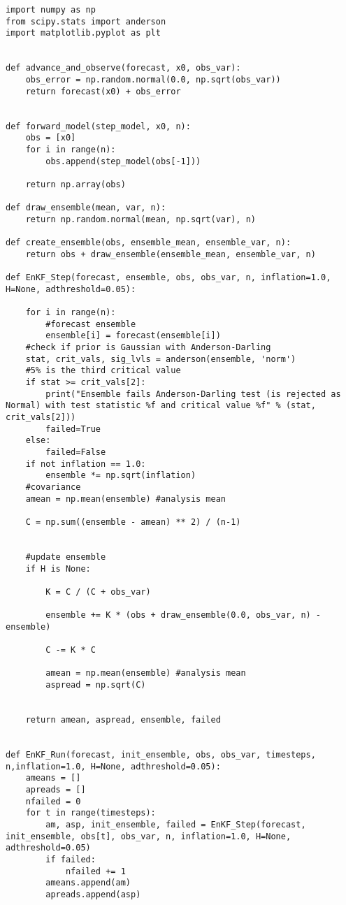 \documentclass[11pt]{article}
\begin{document}
\begin{Verbatim}[xleftmargin=-2cm]
import numpy as np
from scipy.stats import anderson
import matplotlib.pyplot as plt


def advance_and_observe(forecast, x0, obs_var):
    obs_error = np.random.normal(0.0, np.sqrt(obs_var))
    return forecast(x0) + obs_error


def forward_model(step_model, x0, n):
    obs = [x0]
    for i in range(n):
        obs.append(step_model(obs[-1]))

    return np.array(obs)

def draw_ensemble(mean, var, n):
    return np.random.normal(mean, np.sqrt(var), n)

def create_ensemble(obs, ensemble_mean, ensemble_var, n):
    return obs + draw_ensemble(ensemble_mean, ensemble_var, n)

def EnKF_Step(forecast, ensemble, obs, obs_var, n, inflation=1.0, H=None, adthreshold=0.05):
    
    for i in range(n):
        #forecast ensemble
        ensemble[i] = forecast(ensemble[i])
    #check if prior is Gaussian with Anderson-Darling
    stat, crit_vals, sig_lvls = anderson(ensemble, 'norm')
    #5% is the third critical value
    if stat >= crit_vals[2]:
        print("Ensemble fails Anderson-Darling test (is rejected as Normal) with test statistic %f and critical value %f" % (stat, crit_vals[2]))
        failed=True
    else:
        failed=False
    if not inflation == 1.0:
        ensemble *= np.sqrt(inflation)
    #covariance
    amean = np.mean(ensemble) #analysis mean

    C = np.sum((ensemble - amean) ** 2) / (n-1)

    
    #update ensemble
    if H is None:

        K = C / (C + obs_var)

        ensemble += K * (obs + draw_ensemble(0.0, obs_var, n) - ensemble)

        C -= K * C

        amean = np.mean(ensemble) #analysis mean
        aspread = np.sqrt(C)


    return amean, aspread, ensemble, failed


def EnKF_Run(forecast, init_ensemble, obs, obs_var, timesteps, n,inflation=1.0, H=None, adthreshold=0.05):
    ameans = []
    apreads = []
    nfailed = 0
    for t in range(timesteps):
        am, asp, init_ensemble, failed = EnKF_Step(forecast, init_ensemble, obs[t], obs_var, n, inflation=1.0, H=None, adthreshold=0.05)
        if failed:
            nfailed += 1
        ameans.append(am)
        apreads.append(asp)


\end{Verbatim}
\end{document}
